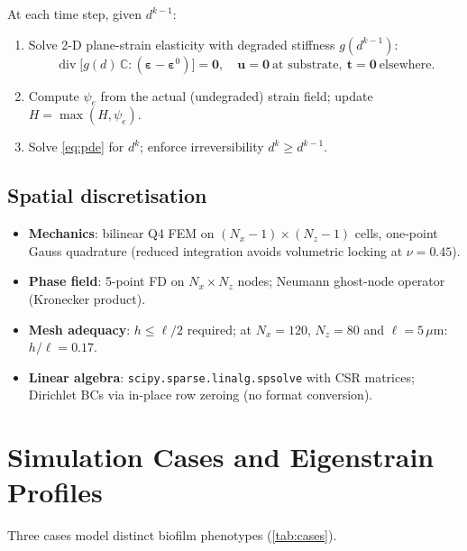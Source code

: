 \documentclass[11pt, a4paper]{article}
\newcommand{\psiE}{\psi_e}
\newcommand{\divop}{\operatorname{div}}
\newcommand{\Hfield}{H}
\newcommand{\um}{$\mu$m}        %
\begin{document}
At each time step, given $d^{k-1}$:
\begin{enumerate}
  \item Solve 2-D plane-strain elasticity with degraded stiffness $g(d^{k-1})$:
        \begin{equation}
          \divop\bigl[g(d)\,\mathbb{C}:(\bm{\varepsilon}-\bm{\varepsilon}^0)\bigr]
          = \bm{0}, \quad \bm{u}=\bm{0}\ \text{at substrate},\
          \bm{t}=\bm{0}\ \text{elsewhere}.
        \end{equation}
  \item Compute $\psiE$ from the actual (undegraded) strain field;
        update $\Hfield = \max(\Hfield, \psiE)$.
  \item Solve \cref{eq:pde} for $d^k$; enforce irreversibility
        $d^k \ge d^{k-1}$.
\end{enumerate}

\subsection{Spatial discretisation}

\begin{itemize}
  \item \textbf{Mechanics}: bilinear Q4 FEM on $(N_x-1)\times(N_z-1)$ cells,
        one-point Gauss quadrature (reduced integration avoids volumetric
        locking at $\nu=0.45$).
  \item \textbf{Phase field}: 5-point FD on $N_x\times N_z$ nodes;
        Neumann ghost-node operator (Kronecker product).
  \item \textbf{Mesh adequacy}: $h \le \ell/2$ required; at
        $N_x=120$, $N_z=80$ and $\ell=5$\,\um: $h/\ell = 0.17$.
  \item \textbf{Linear algebra}: \texttt{scipy.sparse.linalg.spsolve} with CSR
        matrices; Dirichlet BCs via in-place row zeroing (no format conversion).
\end{itemize}

\section{Simulation Cases and Eigenstrain Profiles}
\label{sec:cases}

Three cases model distinct biofilm phenotypes
(\cref{tab:cases}).
\end{document}
